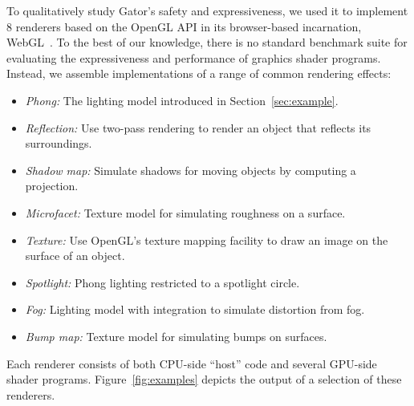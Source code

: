 {%

To qualitatively study Gator's safety and expressiveness, we used it to implement 8 renderers based on the OpenGL API in its browser-based incarnation, WebGL~\cite{webgl}.
To the best of our knowledge, there is no standard benchmark suite for evaluating the expressiveness and performance of graphics shader programs.
Instead, we assemble implementations of a range of common rendering effects:
%
\begin{itemize}
	\item \emph{Phong:} The lighting model introduced in Section~\ref{sec:example}.
	\item \emph{Reflection:} Use two-pass rendering to render an object that reflects its surroundings.
	\item \emph{Shadow map:} Simulate shadows for moving objects by computing a projection.
	\item \emph{Microfacet:} Texture model for simulating roughness on a surface.
	\item \emph{Texture:} Use OpenGL's texture mapping facility to draw an image on the surface of an object.
	\item \emph{Spotlight:} Phong lighting restricted to a spotlight circle.
	\item \emph{Fog:} Lighting model with integration to simulate distortion from fog.
	\item \emph{Bump map:} Texture model for simulating bumps on surfaces.
\end{itemize}
%
Each renderer consists of both CPU-side ``host'' code and several GPU-side shader programs.
Figure~\ref{fig:examples} depicts the output of a selection of these renderers.

}
